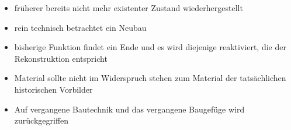 \documentclass[fleqn,twoside]{article}
\begin{document}
\begin{itemize}
            \begin{itemize}
                \item früherer bereits nicht mehr existenter Zustand wiederhergestellt
                \item rein technisch betrachtet ein Neubau
                \item bisherige Funktion findet ein Ende und es wird diejenige reaktiviert, die der Rekonstruktion entspricht
                \item Material sollte nicht im Widerspruch stehen zum Material der tatsächlichen historischen Vorbilder
                \item Auf vergangene Bautechnik und das vergangene Baugefüge wird zurückgegriffen
            \end{itemize}
    \end{itemize}
\end{document}
